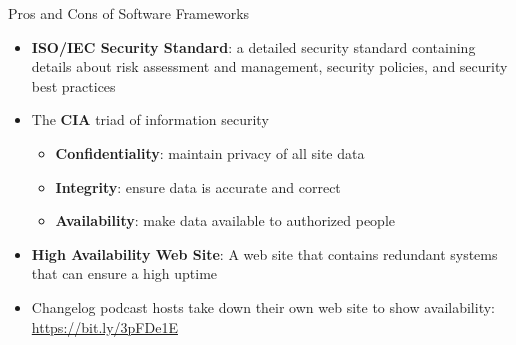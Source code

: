 \documentclass[14pt,aspectratio=169]{beamer}
\begin{document}
%
\begin{frame}{Pros and Cons of Software Frameworks}
  \begin{itemize}
    \item {\bf ISO/IEC Security Standard}: a detailed security standard
      containing details about risk assessment and management, security
      policies, and security best practices
      \vspace*{-.15in}
    \item The {\bf CIA} triad of information security
      \begin{itemize}
        \item {\bf Confidentiality}: maintain privacy of all site data
        \item {\bf Integrity}: ensure data is accurate and correct
        \item {\bf Availability}: make data available to authorized people
      \end{itemize}
      \vspace*{-.25in}
    \item {\bf High Availability Web Site}: A web site that contains redundant
      systems that can ensure a high uptime
      \vspace*{-.25in}
    \item Changelog podcast hosts take down their own web site to show
      availability: \url{https://bit.ly/3pFDe1E}
  \end{itemize}
\end{frame}
\end{document}
